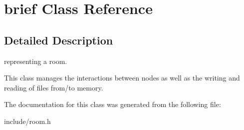 \hypertarget{classbrief}{}\section{brief Class Reference}
\label{classbrief}


\subsection{Detailed Description}
representing a room.

This class manages the interactions between nodes as well as the writing and reading of files from/to memory. 

The documentation for this class was generated from the following file\+:\begin{DoxyCompactItemize}
\item 
include/room.\+h\end{DoxyCompactItemize}
